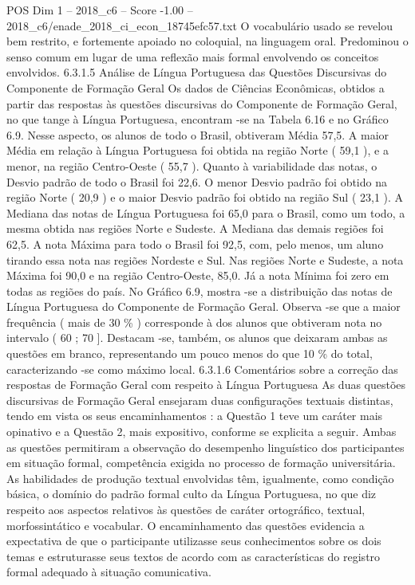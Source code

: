 \begin{textsample}{POS Dim 1 – 2018\_c6 – Score -1.00 – 2018\_c6/enade\_2018\_ci\_econ\_18745efc57.txt}
O vocabulário usado se revelou bem restrito, e fortemente apoiado no coloquial, na linguagem oral.
Predominou o senso comum em lugar de uma reflexão mais formal envolvendo os conceitos envolvidos. 6.3.1.5 Análise de Língua Portuguesa das Questões Discursivas do Componente de Formação Geral Os dados de Ciências Econômicas, obtidos a partir das respostas às questões discursivas do Componente de Formação Geral, no que tange à Língua Portuguesa, encontram -se na Tabela 6.16 e no Gráfico 6.9.
Nesse aspecto, os alunos de todo o Brasil, obtiveram Média 57,5.
A maior Média em relação à Língua Portuguesa foi obtida na região Norte ( 59,1 ), e a menor, na região Centro-Oeste ( 55,7 ).
Quanto à variabilidade das notas, o Desvio padrão de todo o Brasil foi 22,6.
O menor Desvio padrão foi obtido na região Norte ( 20,9 ) e o maior Desvio padrão foi obtido na região Sul ( 23,1 ).
A Mediana das notas de Língua Portuguesa foi 65,0 para o Brasil, como um todo, a mesma obtida nas regiões Norte e Sudeste.
A Mediana das demais regiões foi 62,5.
A nota Máxima para todo o Brasil foi 92,5, com, pelo menos, um aluno tirando essa nota nas regiões Nordeste e Sul.
Nas regiões Norte e Sudeste, a nota Máxima foi 90,0 e na região Centro-Oeste, 85,0.
Já a nota Mínima foi zero em todas as regiões do país.
No Gráfico 6.9, mostra -se a distribuição das notas de Língua Portuguesa do Componente de Formação Geral.
Observa -se que a maior frequência ( mais de 30 \% ) corresponde à dos alunos que obtiveram nota no intervalo ( 60 ; 70 ].
Destacam -se, também, os alunos que deixaram ambas as questões em branco, representando um pouco menos do que 10 \% do total, caracterizando -se como máximo local. 6.3.1.6 Comentários sobre a correção das respostas de Formação Geral com respeito à Língua Portuguesa As duas questões discursivas de Formação Geral ensejaram duas configurações textuais distintas, tendo em vista os seus encaminhamentos : a Questão 1 teve um caráter mais opinativo e a Questão 2, mais expositivo, conforme se explicita a seguir.
Ambas as questões permitiram a observação do desempenho linguístico dos participantes em situação formal, competência exigida no processo de formação universitária.
As habilidades de produção textual envolvidas têm, igualmente, como condição básica, o domínio do padrão formal culto da Língua Portuguesa, no que diz respeito aos aspectos relativos às questões de caráter ortográfico, textual, morfossintático e vocabular.
O encaminhamento das questões evidencia a expectativa de que o participante utilizasse seus conhecimentos sobre os dois temas e estruturasse seus textos de acordo com as características do registro formal adequado à situação comunicativa.

\end{textsample}
